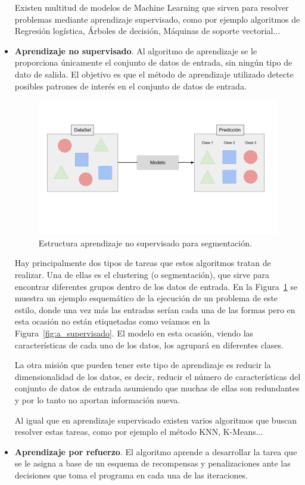 \documentclass[a4paper, 12pt]{book}
\begin{document}
\begin{itemize}
    Existen multitud de modelos de Machine Learning que sirven para resolver problemas mediante aprendizaje supervisado, como por ejemplo algoritmos de Regresión logística, Árboles de decisión, Máquinas de soporte vectorial...
    
    \item \textbf{Aprendizaje no supervisado}. Al algoritmo de aprendizaje se le proporciona únicamente el conjunto de datos de entrada, sin ningún tipo de dato de salida. El objetivo es que el método de aprendizaje utilizado detecte posibles patrones de interés en el conjunto de datos de entrada. 
    
    \begin{figure}[h!]
      \centering
      \includegraphics[width=12cm, keepaspectratio]{img/a_no_supervisado.png}
      \caption{Estructura aprendizaje no supervisado para segmentación.}\label{fig:a_no_supervisado}
    \end{figure}
    
    Hay principalmente dos tipos de tareas que estos algoritmos tratan de realizar. Una de ellas es el clustering (o segmentación), que sirve para encontrar diferentes grupos dentro de los datos de entrada. En la Figura~\ref{fig:a_no_supervisado} se muestra un ejemplo esquemático de la ejecución de un problema de este estilo, donde una vez más las entradas serían cada una de las formas pero en esta ocasión no están etiquetadas como veíamos en la Figura~\ref{fig:a_supervisado}. El modelo en esta ocasión, viendo las características de cada uno de los datos, los agrupará en diferentes clases.
    
    La otra misión que pueden tener este tipo de aprendizaje es reducir la dimensionalidad de los datos, es decir, reducir el número de características del conjunto de datos de entrada asumiendo que muchas de ellas son redundantes y por lo tanto no aportan información nueva.
    
    Al igual que en aprendizaje supervisado existen varios algoritmos que buscan resolver estas tareas, como por ejemplo el método KNN, K-Means...
    
    \item \textbf{Aprendizaje por refuerzo}. El algoritmo aprende a desarrollar la tarea que se le asigna a base de un esquema de recompensas y penalizaciones ante las decisiones que toma el programa en cada una de las iteraciones.
\end{itemize}
\end{document}
